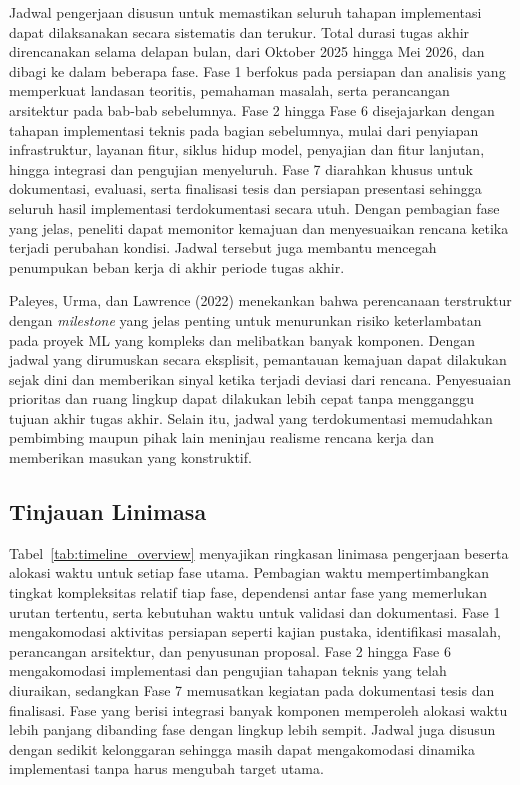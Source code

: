 Jadwal pengerjaan disusun untuk memastikan seluruh tahapan implementasi dapat dilaksanakan secara sistematis dan terukur. Total durasi tugas akhir direncanakan selama delapan bulan, dari Oktober 2025 hingga Mei 2026, dan dibagi ke dalam beberapa fase. Fase 1 berfokus pada persiapan dan analisis yang memperkuat landasan teoritis, pemahaman masalah, serta perancangan arsitektur pada bab-bab sebelumnya. Fase 2 hingga Fase 6 disejajarkan dengan tahapan implementasi teknis pada bagian sebelumnya, mulai dari penyiapan infrastruktur, layanan fitur, siklus hidup model, penyajian dan fitur lanjutan, hingga integrasi dan pengujian menyeluruh. Fase 7 diarahkan khusus untuk dokumentasi, evaluasi, serta finalisasi tesis dan persiapan presentasi sehingga seluruh hasil implementasi terdokumentasi secara utuh. Dengan pembagian fase yang jelas, peneliti dapat memonitor kemajuan dan menyesuaikan rencana ketika terjadi perubahan kondisi. Jadwal tersebut juga membantu mencegah penumpukan beban kerja di akhir periode tugas akhir.

Paleyes, Urma, dan Lawrence (2022) menekankan bahwa perencanaan terstruktur dengan \textit{milestone} yang jelas penting untuk menurunkan risiko keterlambatan pada proyek ML yang kompleks dan melibatkan banyak komponen. Dengan jadwal yang dirumuskan secara eksplisit, pemantauan kemajuan dapat dilakukan sejak dini dan memberikan sinyal ketika terjadi deviasi dari rencana. Penyesuaian prioritas dan ruang lingkup dapat dilakukan lebih cepat tanpa mengganggu tujuan akhir tugas akhir. Selain itu, jadwal yang terdokumentasi memudahkan pembimbing maupun pihak lain meninjau realisme rencana kerja dan memberikan masukan yang konstruktif.

\subsection{Tinjauan Linimasa}

Tabel~\ref{tab:timeline_overview} menyajikan ringkasan linimasa pengerjaan beserta alokasi waktu untuk setiap fase utama. Pembagian waktu mempertimbangkan tingkat kompleksitas relatif tiap fase, dependensi antar fase yang memerlukan urutan tertentu, serta kebutuhan waktu untuk validasi dan dokumentasi. Fase 1 mengakomodasi aktivitas persiapan seperti kajian pustaka, identifikasi masalah, perancangan arsitektur, dan penyusunan proposal. Fase 2 hingga Fase 6 mengakomodasi implementasi dan pengujian tahapan teknis yang telah diuraikan, sedangkan Fase 7 memusatkan kegiatan pada dokumentasi tesis dan finalisasi. Fase yang berisi integrasi banyak komponen memperoleh alokasi waktu lebih panjang dibanding fase dengan lingkup lebih sempit. Jadwal juga disusun dengan sedikit kelonggaran sehingga masih dapat mengakomodasi dinamika implementasi tanpa harus mengubah target utama.

